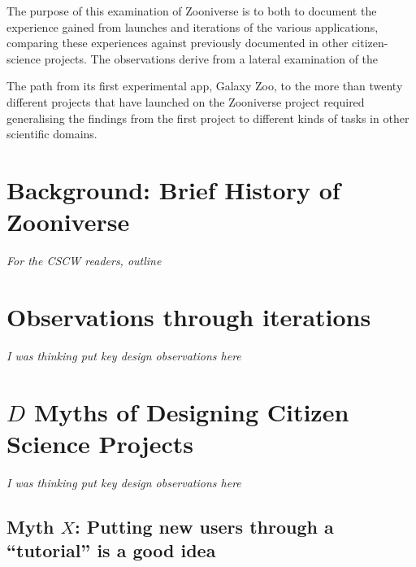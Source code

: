 \documentclass{sigchi}
\begin{document}
The purpose of this examination of Zooniverse is to both to document
the experience gained from launches and iterations of the various
applications, comparing these experiences against previously
documented in other citizen-science projects.  The observations derive
from a lateral examination of the

The path from its first experimental app, Galaxy Zoo, to the more than
twenty different projects that have launched on the Zooniverse project
required generalising the findings from the first project to different
kinds of tasks in other scientific domains.




\section{Background: Brief History of Zooniverse}

\emph{For the CSCW readers, outline }

\section{Observations through iterations}

\emph{I was thinking put key design observations here}

\section{$D$ Myths of Designing Citizen Science Projects}

\emph{I was thinking put key design observations here}

\subsection{Myth $X$: Putting new users through a ``tutorial'' is a good idea}
\end{document}
